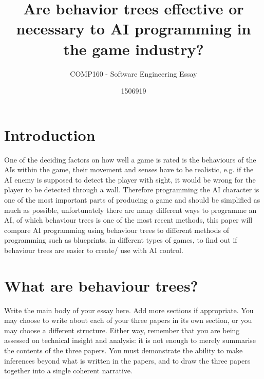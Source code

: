 \documentclass{scrartcl}
\title{Are behavior trees effective or necessary to AI programming in the game industry?}
\subtitle{COMP160 - Software Engineering Essay}
\author{1506919}
\begin{document}
\maketitle


\section{Introduction}

One of the deciding factors on how well a game is rated is the behaviours of the AIs within the game, their movement and senses have to be realistic, e.g. if the AI enemy is supposed to detect the player with sight, it would be wrong for the player to be detected through a wall. Therefore programming the AI character is one of the most important parts of producing a game and should be simplified as much as possible, unfortunately  there are many different ways to programme an AI, of which behaviour trees is one of the most recent methods, this paper will compare AI programming using behaviour trees to different methods of programming such as blueprints, in different types of games, to find out if behaviour trees are easier to create/ use with AI control.

\section{What are behaviour trees?}

Write the main body of your essay here. Add more sections if appropriate. You may choose to write about each of your three papers in its own section, or you may choose a different structure. Either way, remember that you are being assessed on technical insight and analysis: it is not enough to merely summarise the contents of the three papers. You must demonstrate the ability to make inferences beyond what is written in the papers, and to draw the three papers together into a single coherent narrative.
\end{document}

